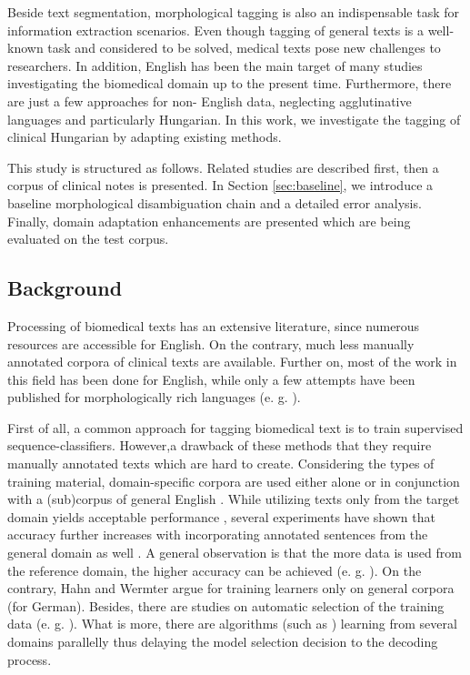 Beside text segmentation, morphological tagging is also an indispensable task for information extraction scenarios. 
Even though tagging of general texts is a well-known task and considered to be solved, medical texts pose new challenges to researchers. 
In addition, English has been the main target of many studies investigating the biomedical domain up to the present time. 
Furthermore, there are just a few approaches for non- English data, neglecting agglutinative languages and particularly Hungarian.
In this work, we investigate the tagging of clinical Hungarian by adapting existing methods.%

This study is structured as follows. 
Related studies are described first, then a corpus of clinical notes is presented.
In Section \ref{sec:baseline}, we introduce a baseline morphological disambiguation chain and a detailed error analysis. 
Finally, domain adaptation enhancements are presented which are being evaluated on the test corpus.

\subsection{Background}
\label{sec:biomed_tag}

Processing of biomedical texts has an extensive literature, since numerous resources are accessible for English. %
On the contrary, much less manually annotated corpora of clinical texts are available. 
Further on, most of the work in this field has been done for English, while only a few attempts have been published for morphologically rich languages (e. g. \cite{oleynik2009performance,rost2008lessons}).

First of all, a common approach for tagging biomedical text is to train supervised sequence-classifiers. 
However,a drawback of these methods that they require manually annotated texts which are hard to create.%
Considering the types of training material, domain-specific corpora are used either alone \cite{pakhomov2006developing,savova2010mayo,Smith2006} or in conjunction with a (sub)corpus of general English \cite{coden2005domain,ferraro2013improving,miller2007building}.%
While utilizing texts only from the target domain yields acceptable performance \cite{pakhomov2006developing,savova2010mayo,Smith2006}, 
several experiments have shown that accuracy further increases with incorporating annotated sentences from the general domain as well \cite{barrett2011token,coden2005domain}. 
A general observation is that the more data is used from the reference domain, the higher accuracy can be achieved (e. g. \cite{pestian2004development}). 
On the contrary, Hahn and Wermter argue for training learners only on general corpora \cite{hahn2004tagging} (for German). 
Besides, there are studies on automatic selection of the training data (e. g. \cite{liu2007heuristic}).%
What is more, there are algorithms (such as \cite{choi2012fast}) learning from several domains parallelly thus delaying the model selection decision to the decoding process. 

